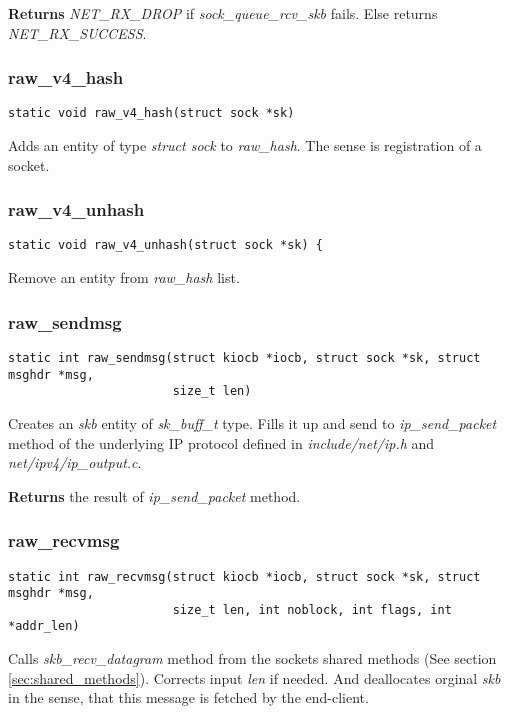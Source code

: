 \documentclass[12pt,a4paper]{article}
\begin{document}
{\bf Returns} {\it NET\_RX\_DROP} if {\it sock\_queue\_rcv\_skb} fails. Else
returns {\it NET\_RX\_SUCCESS}.

\subsubsection{raw\_v4\_hash}
\label{sec:raw_sock_raw_v4_hash}
\begin{verbatim}
static void raw_v4_hash(struct sock *sk)
\end{verbatim}
Adds an entity of type {\it struct sock} to {\it raw\_hash}. The sense is
registration of a socket.

\subsubsection{raw\_v4\_unhash}
\label{sec:raw_sock_raw_v4_unhash}
\begin{verbatim}
static void raw_v4_unhash(struct sock *sk) {
\end{verbatim}
Remove an entity from {\it raw\_hash} list.

\subsubsection{raw\_sendmsg}
\label{sec:raw_sock_raw_sendmsg}
\begin{verbatim}
static int raw_sendmsg(struct kiocb *iocb, struct sock *sk, struct msghdr *msg,
                       size_t len)
\end{verbatim}
Creates an {\it skb} entity of {\it sk\_buff\_t} type. Fills it up and
send to {\it ip\_send\_packet} method of the underlying IP protocol
defined in {\it include/net/ip.h} and {\it net/ipv4/ip\_output.c}.

{\bf Returns} the result of {\it ip\_send\_packet} method.

\subsubsection{raw\_recvmsg}
\label{sec:raw_sock_raw_recvmsg}
\begin{verbatim}
static int raw_recvmsg(struct kiocb *iocb, struct sock *sk, struct msghdr *msg,
                       size_t len, int noblock, int flags, int *addr_len)
\end{verbatim}
Calls {\it skb\_recv\_datagram} method from the sockets shared methods
(See section \ref{sec:shared_methods}). Corrects input {\it len} if needed.
And deallocates orginal {\it skb} in the sense, that this message is fetched
by the end-client.
\end{document}
